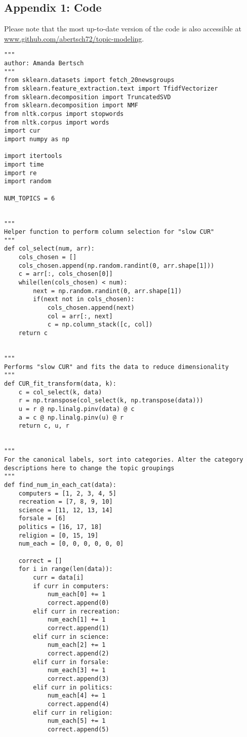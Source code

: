 \documentclass{article}
\begin{document}
\subsection{Appendix 1: Code}
Please note that the most up-to-date version of the code is also accessible at \url{www.github.com/abertsch72/topic-modeling}.
\begin{verbatim}    
"""
author: Amanda Bertsch
"""
from sklearn.datasets import fetch_20newsgroups
from sklearn.feature_extraction.text import TfidfVectorizer
from sklearn.decomposition import TruncatedSVD
from sklearn.decomposition import NMF
from nltk.corpus import stopwords
from nltk.corpus import words
import cur
import numpy as np

import itertools
import time
import re
import random

NUM_TOPICS = 6


"""
Helper function to perform column selection for "slow CUR"
"""
def col_select(num, arr):
    cols_chosen = []
    cols_chosen.append(np.random.randint(0, arr.shape[1]))
    c = arr[:, cols_chosen[0]]
    while(len(cols_chosen) < num):
        next = np.random.randint(0, arr.shape[1])
        if(next not in cols_chosen):
            cols_chosen.append(next)
            col = arr[:, next]
            c = np.column_stack([c, col])
    return c


"""
Performs "slow CUR" and fits the data to reduce dimensionality
"""
def CUR_fit_transform(data, k):
    c = col_select(k, data)
    r = np.transpose(col_select(k, np.transpose(data)))
    u = r @ np.linalg.pinv(data) @ c
    a = c @ np.linalg.pinv(u) @ r
    return c, u, r


"""
For the canonical labels, sort into categories. Alter the category 
descriptions here to change the topic groupings
"""
def find_num_in_each_cat(data):
    computers = [1, 2, 3, 4, 5]
    recreation = [7, 8, 9, 10]
    science = [11, 12, 13, 14]
    forsale = [6]
    politics = [16, 17, 18]
    religion = [0, 15, 19]
    num_each = [0, 0, 0, 0, 0, 0]

    correct = []
    for i in range(len(data)):
        curr = data[i]
        if curr in computers:
            num_each[0] += 1
            correct.append(0)
        elif curr in recreation:
            num_each[1] += 1
            correct.append(1)
        elif curr in science:
            num_each[2] += 1
            correct.append(2)
        elif curr in forsale:
            num_each[3] += 1
            correct.append(3)
        elif curr in politics:
            num_each[4] += 1
            correct.append(4)
        elif curr in religion:
            num_each[5] += 1
            correct.append(5)


\end{verbatim}
\end{document}
